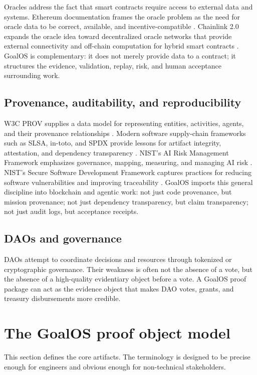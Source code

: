 Oracles address the fact that smart contracts require access to external data and systems. Ethereum documentation frames the oracle problem as the need for oracle data to be correct, available, and incentive-compatible \citep{ethereumOracles}. Chainlink 2.0 expands the oracle idea toward decentralized oracle networks that provide external connectivity and off-chain computation for hybrid smart contracts \citep{chainlink2}. GoalOS is complementary: it does not merely provide data to a contract; it structures the evidence, validation, replay, risk, and human acceptance surrounding work.

\subsection{Provenance, auditability, and reproducibility}

W3C PROV supplies a data model for representing entities, activities, agents, and their provenance relationships \citep{w3cProv}. Modern software supply-chain frameworks such as SLSA, in-toto, and SPDX provide lessons for artifact integrity, attestation, and dependency transparency \citep{slsa,inToto,spdx}. NIST's AI Risk Management Framework emphasizes governance, mapping, measuring, and managing AI risk \citep{nistAirmf}. NIST's Secure Software Development Framework captures practices for reducing software vulnerabilities and improving traceability \citep{nistSSDF}. GoalOS imports this general discipline into blockchain and agentic work: not just code provenance, but mission provenance; not just dependency transparency, but claim transparency; not just audit logs, but acceptance receipts.

\subsection{DAOs and governance}

DAOs attempt to coordinate decisions and resources through tokenized or cryptographic governance. Their weakness is often not the absence of a vote, but the absence of a high-quality evidentiary object before a vote. A GoalOS proof package can act as the evidence object that makes DAO votes, grants, and treasury disbursements more credible.

\section{The GoalOS proof object model}

This section defines the core artifacts. The terminology is designed to be precise enough for engineers and obvious enough for non-technical stakeholders.

